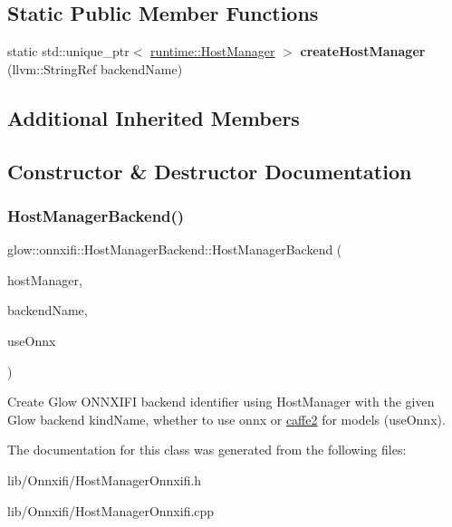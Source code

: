 \subsection*{Static Public Member Functions}
\begin{DoxyCompactItemize}
\item 
\mbox{\label{classglow_1_1onnxifi_1_1_host_manager_backend_ac7501569fb1ac0973c5962bd2ad74120}} 
static std\+::unique\+\_\+ptr$<$ \hyperlink{classglow_1_1runtime_1_1_host_manager}{runtime\+::\+Host\+Manager} $>$ {\bfseries create\+Host\+Manager} (llvm\+::\+String\+Ref backend\+Name)
\end{DoxyCompactItemize}
\subsection*{Additional Inherited Members}


\subsection{Constructor \& Destructor Documentation}
\mbox{\label{classglow_1_1onnxifi_1_1_host_manager_backend_a1e685c23b29ab980ca2636c4b828b854}} 
\subsubsection{\texorpdfstring{Host\+Manager\+Backend()}{HostManagerBackend()}}
{\footnotesize\ttfamily glow\+::onnxifi\+::\+Host\+Manager\+Backend\+::\+Host\+Manager\+Backend (\begin{DoxyParamCaption}\item[{std\+::shared\+\_\+ptr$<$ \hyperlink{classglow_1_1runtime_1_1_host_manager}{runtime\+::\+Host\+Manager} $>$}]{host\+Manager,  }\item[{llvm\+::\+String\+Ref}]{backend\+Name,  }\item[{bool}]{use\+Onnx }\end{DoxyParamCaption})\hspace{0.3cm}{\ttfamily [inline]}}

Create Glow O\+N\+N\+X\+I\+FI backend identifier using Host\+Manager with the given Glow backend {\ttfamily kind\+Name}, whether to use onnx or \hyperlink{namespacecaffe2}{caffe2} for models ({\ttfamily use\+Onnx}). 

The documentation for this class was generated from the following files\+:\begin{DoxyCompactItemize}
\item 
lib/\+Onnxifi/Host\+Manager\+Onnxifi.\+h\item 
lib/\+Onnxifi/Host\+Manager\+Onnxifi.\+cpp\end{DoxyCompactItemize}
